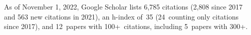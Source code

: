 %
As of November 1, 2022, Google Scholar lists
6,785 citations (2,808 since 2017 and 563 new citations in 2021),
an h-index of~35 (24~counting only citations since 2017),
and 12~papers with 100+~citations, including 5~papers with 300+.
